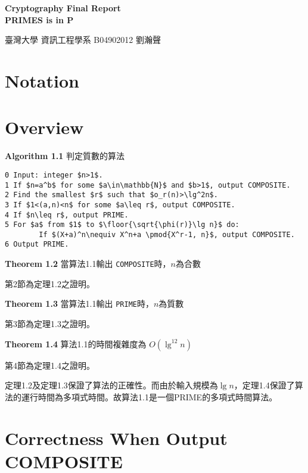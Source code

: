 \documentclass{article}
\DeclarePairedDelimiter\floor{\lfloor}{\rfloor}
\newcommand{\nequiv}{\not\equiv}
\begin{document}
\fontsize{12pt}{20pt}\selectfont
\begin{center}
	\bfseries\huge{Cryptography Final Report\\PRIMES is in P}\\
\end{center}
{
    \hfill 臺灣大學 資訊工程學系 B04902012 劉瀚聲
}
\section{Notation}
\section{Overview}
\begin{mdframed}
\noindent\textbf{Algorithm 1.1} 判定質數的算法
\begin{lstlisting}[mathescape=true]
0 Input: integer $n>1$.
1 If $n=a^b$ for some $a\in\mathbb{N}$ and $b>1$, output COMPOSITE.
2 Find the smallest $r$ such that $o_r(n)>\lg^2n$.
3 If $1<(a,n)<n$ for some $a\leq r$, output COMPOSITE.
4 If $n\leq r$, output PRIME.
5 For $a$ from $1$ to $\floor{\sqrt{\phi(r)}\lg n}$ do:
        If $(X+a)^n\nequiv X^n+a \pmod{X^r-1, n}$, output COMPOSITE.
6 Output PRIME.
\end{lstlisting}
\end{mdframed}

\begin{mdframed}
\noindent\textbf{Theorem 1.2} 當算法1.1輸出 \texttt{COMPOSITE}時，$n$為合數
\end{mdframed}

    第2節為定理1.2之證明。

\begin{mdframed}
\noindent\textbf{Theorem 1.3} 當算法1.1輸出 \texttt{PRIME}時，$n$為質數
\end{mdframed}

    第3節為定理1.3之證明。

\begin{mdframed}
\noindent\textbf{Theorem 1.4} 算法1.1的時間複雜度為 \(O(\lg^{12}n)\)
\end{mdframed}
    
    第4節為定理1.4之證明。

    定理1.2及定理1.3保證了算法的正確性。而由於輸入規模為$\lg n$，定理1.4保證了算法的運行時間為多項式時間。故算法1.1是一個PRIME的多項式時間算法。

\section{Correctness When Output COMPOSITE}
\end{document}
